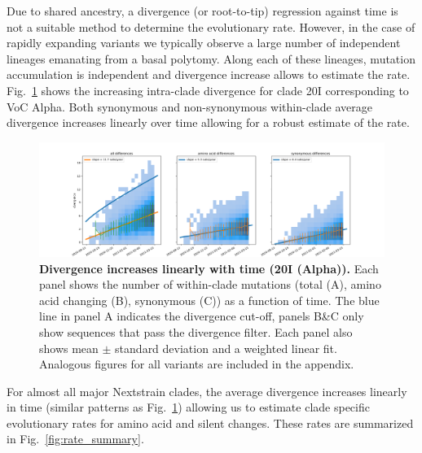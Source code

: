 \documentclass[aps,rmp, twocolumn]{revtex4}
\begin{document}
Due to shared ancestry, a divergence (or root-to-tip) regression against time is not a suitable method to determine the evolutionary rate.
However, in the case of rapidly expanding variants we typically observe a large number of independent lineages emanating from a basal polytomy.
Along each of these lineages, mutation accumulation is independent and divergence increase allows to estimate the rate.
Fig.~\ref{fig:rate_alpha} shows the increasing intra-clade divergence for clade 20I corresponding to VoC Alpha.
Both synonymous and non-synonymous within-clade average divergence increases linearly over time allowing for a robust estimate of the rate.

\begin{figure}[tb]
    \includegraphics[width=\textwidth]{figures/rtt/20I_rtt.png}
    \caption{{\bf Divergence increases linearly with time (20I (Alpha)).} Each panel shows the number of within-clade mutations (total (A), amino acid changing (B), synonymous (C)) as a function of time.
    The blue line in panel A indicates the divergence cut-off, panels B\&C only show sequences that pass the divergence filter. Each panel also shows mean $\pm$ standard deviation and a weighted linear fit. Analogous figures for all variants are included in the appendix.
    \label{fig:rate_alpha}}
\end{figure}

For almost all major Nextstrain clades, the average divergence increases linearly in time (similar patterns as Fig.~\ref{fig:rate_alpha}) allowing us to estimate clade specific evolutionary rates for amino acid and silent changes.
These rates are summarized in Fig.~\ref{fig:rate_summary}.
\end{document}
